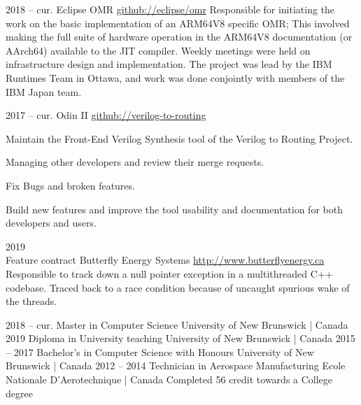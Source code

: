 \documentclass[9.5pt]{developercv} %
\begin{document}

\begin{entrylist}

    \entry
        {2018 -- cur.}
        {Eclipse OMR}
        {\href{https://github.com/eclipse/omr}{github://eclipse/omr}}{ 
            Responsible for initiating the work on the basic implementation of an ARM64V8 specific OMR; This involved making the full suite of hardware operation in the ARM64V8 documentation (or AArch64) available to the JIT compiler. 
            Weekly meetings were held on infrastructure design and implementation. 
            The project was lead by the IBM Runtimes Team in Ottawa, and work was done conjointly with members of the IBM Japan team.
            }

    \entry
        {2017 -- cur.}
        {Odin II}
        {\href{https://github.com/verilog-to-routing/vtr-verilog-to-routing/graphs/contributors}{github://verilog-to-routing}}{ 
            Maintain the Front-End Verilog Synthesis tool of the Verilog to Routing Project.
            \begin{tightemize}
            \item Managing other developers and review their merge requests.
            \item Fix Bugs and broken features.
            \item Build new features and improve the tool usability and documentation for both developers and users.
            \end{tightemize}
            }

    \entry
        {2019 \\{\footnotesize Feature contract}}
        {Butterfly Energy Systems}
        {\href{http://www.butterflyenergy.ca/home.php}{http://www.butterflyenergy.ca}}{ 
            Responsible to track down a null pointer exception in a multithreaded C++ codebase.
            Traced back to a race condition because of uncaught spurious wake of the threads.
            }

\end{entrylist}


\begin{entrylist}
    \entry
        {2018 -- cur.}
        {Master in Computer Science}
        {University of New Brunswick | Canada}
        {}
    \entry
        {2019}
        {Diploma in University teaching}
        {University of New Brunswick | Canada}
        {}
    \entry
        {2015 -- 2017}
        {Bachelor's in Computer Science with Honours}
        {University of New Brunswick | Canada}
        {}
    \entry
        {2012 -- 2014}
        {Technician in Aerospace Manufacturing}
        {Ecole Nationale D'Aerotechnique | Canada}
        {Completed 56 credit towards a College degree}
\end{entrylist}
\end{document}
